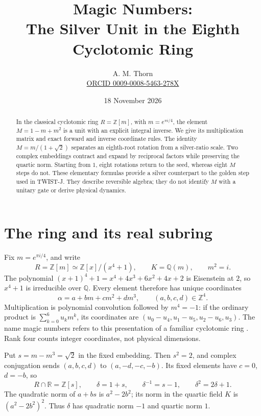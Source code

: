 \documentclass[11pt,a4paper]{article}
\title{Magic Numbers:\\The Silver Unit in the Eighth Cyclotomic Ring}
\author{A. M. Thorn\\\small\href{https://orcid.org/0009-0008-5463-278X}{ORCID 0009-0008-5463-278X}}
\date{18 November 2026}
\newcommand{\Z}{\mathbb Z}
\newcommand{\Q}{\mathbb Q}
\begin{document}
\maketitle
\begin{abstract}
In the classical cyclotomic ring $R=\Z[m]$, with $m=e^{\pi i/4}$,
the element $M=1-m+m^2$ is a unit with an explicit integral inverse.
We give its multiplication matrix and exact forward and inverse
coordinate rules. The identity $M=m/(1+\sqrt2)$ separates an
eighth-root rotation from a silver-ratio scale. Two complex embeddings
contract and expand by reciprocal factors while preserving the quartic
norm. Starting from $1$, eight rotations return to the seed, whereas eight
$M$ steps do not. These elementary formulas provide a silver counterpart
to the golden step used in TWIST-J. They describe reversible algebra;
they do not identify $M$ with a unitary gate or derive physical dynamics.
\end{abstract}

\section{The ring and its real subring}\label{sec:ring}
Fix $m=e^{\pi i/4}$, and write
\begin{equation}\label{eq:ring}
 R=\Z[m]\simeq\Z[x]/(x^4+1),\qquad K=\Q(m),\qquad m^2=i.
\end{equation}
The polynomial $(x+1)^4+1=x^4+4x^3+6x^2+4x+2$ is
Eisenstein at $2$, so $x^4+1$ is irreducible over $\Q$.
Every element therefore has unique coordinates
\begin{equation}\label{eq:coordinates}
 \alpha=a+bm+cm^2+dm^3,\qquad (a,b,c,d)\in\Z^4.
\end{equation}
Multiplication is polynomial convolution followed by $m^4=-1$:
if the ordinary product is $\sum_{k=0}^6u_km^k$, its coordinates are
$(u_0-u_4,u_1-u_5,u_2-u_6,u_3)$. The name magic numbers refers
to this presentation of a familiar cyclotomic ring \cite{washington}.
Rank four counts integer coordinates, not physical dimensions.

Put $s=m-m^3=\sqrt2$ in the fixed embedding. Then $s^2=2$,
and complex conjugation sends $(a,b,c,d)$ to $(a,-d,-c,-b)$.
Its fixed elements have $c=0$, $d=-b$, so
\begin{equation}\label{eq:real}
 R\cap\mathbb R=\Z[s],\qquad
 \delta=1+s,\qquad \delta^{-1}=s-1,\qquad \delta^2=2\delta+1.
\end{equation}
The quadratic norm of $a+bs$ is $a^2-2b^2$; its norm in the
quartic field $K$ is $(a^2-2b^2)^2$. Thus $\delta$ has quadratic
norm $-1$ and quartic norm $1$.
\end{document}
